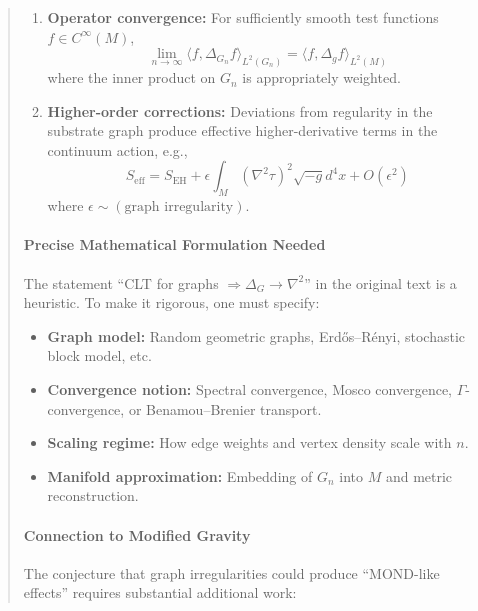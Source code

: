 \documentclass[11pt,titlepage]{article}
\begin{document}
\begin{abstract}
\begin{tcolorbox}[colback=yellow!5!white,colframe=yellow!75!black,title=Research Direction (Graph Continuum Limit)]
\begin{enumerate}
\item \textbf{Operator convergence:} For sufficiently smooth test functions $f \in C^\infty(M)$,
\[
\lim_{n \to \infty} \langle f, \Delta_{G_n} f \rangle_{L^2(G_n)} = \langle f, \Delta_g f \rangle_{L^2(M)}
\]
where the inner product on $G_n$ is appropriately weighted.

\item \textbf{Higher-order corrections:} Deviations from regularity in the substrate graph produce effective higher-derivative terms in the continuum action, e.g.,
\[
S_{\text{eff}} = S_{\text{EH}} + \epsilon \int_M (\nabla^2 \tau)^2 \sqrt{-g} d^4x + O(\epsilon^2)
\]
where $\epsilon \sim (\text{graph irregularity})$.
\end{enumerate}
\end{tcolorbox}

\paragraph{Precise Mathematical Formulation Needed}
The statement ``CLT for graphs $\Rightarrow \Delta_G \to \nabla^2$'' in the original text is a heuristic. To make it rigorous, one must specify:

\begin{itemize}
\item \textbf{Graph model:} Random geometric graphs, Erdős--Rényi, stochastic block model, etc.
\item \textbf{Convergence notion:} Spectral convergence, Mosco convergence, $\Gamma$-convergence, or Benamou--Brenier transport.
\item \textbf{Scaling regime:} How edge weights and vertex density scale with $n$.
\item \textbf{Manifold approximation:} Embedding of $G_n$ into $M$ and metric reconstruction.
\end{itemize}

\paragraph{Connection to Modified Gravity}
The conjecture that graph irregularities could produce ``MOND-like effects'' requires substantial additional work:


\end{abstract}
\end{document}
